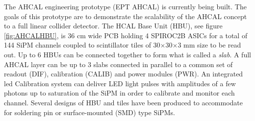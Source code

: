 The AHCAL engineering prototype (EPT AHCAL) \cite{Felix:ProtoAHCAL} is currently being built. The goals of this prototype are to demonstrate the scalability of the AHCAL concept to a full linear collider detector. The HCAL Base Unit (HBU), see figure \ref{fig:AHCALHBU}, is 36 cm wide PCB holding 4 SPIROC2B ASICs for a total of 144 SiPM channels coupled to scintillator tiles of 30$\times$30$\times$3 mm size to be read out. Up to 6 HBUs can be connected together to form what is called a \textit{slab}. A full AHCAL layer can be up to 3 slabs connected in parallel to a common set of readout (DIF), calibration (CALIB) and power modules (PWR). An integrated \acrshort{led} Calibration system can deliver LED light pulses with amplitudes of a few photons up to saturation of the SiPM in order to calibrate and monitor each channel. Several designs of HBU and tiles have been produced to accommodate for soldering pin or surface-mounted (SMD) type SiPMs.

